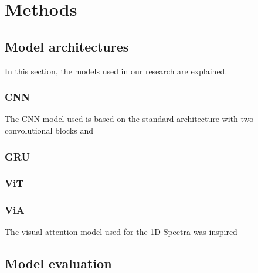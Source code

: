 


\chapter{Methods} %

\label{Chapter3} %







\section{Model architectures}
In this section, the models used in our research are explained.

\subsection{CNN}
The CNN model used is based on the standard architecture with two convolutional blocks and 


\subsection{GRU}


\subsection{ViT}



\subsection{ViA}
The visual attention model used for the 1D-Spectra was inspired 



\section{Model evaluation}


